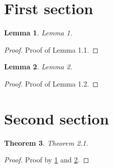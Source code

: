 \documentclass[a4paper,11pt]{article}
\newtheorem{thm}{Theorem}[section]
\newtheorem{lem}[thm]{Lemma}
\begin{document}
	
	\section{First section}
	
	\begin{lem}
		\label{x}
		Lemma 1.
	\end{lem}
	\begin{proof}
		Proof of Lemma 1.1.
	\end{proof}
	
	\begin{lem}
		\label{y}
		Lemma 2.
	\end{lem}
	\begin{proof}
		Proof of Lemma 1.2.
	\end{proof}
	
	\section{Second section}
	
	\begin{thm}
		Theorem 2.1.
	\end{thm}
	
	\begin{proof}
		Proof by \ref{x} and \ref{y}.
	\end{proof}
	
\end{document}
